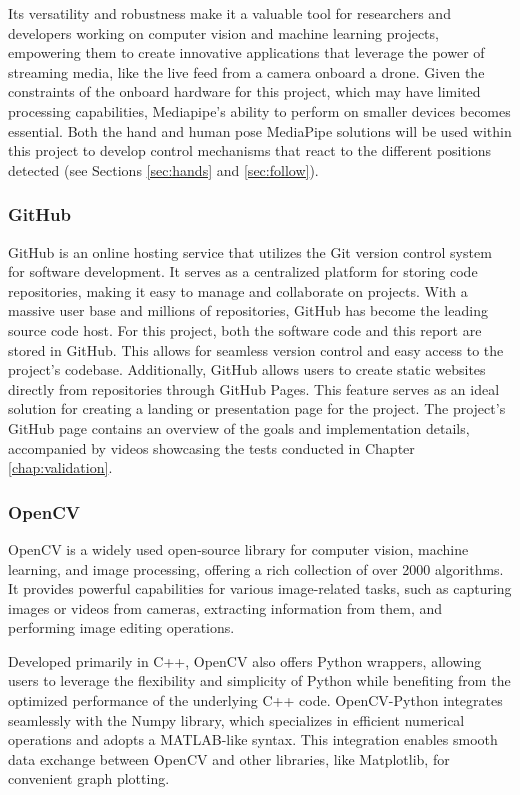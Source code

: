 Its versatility and robustness make it a valuable tool for researchers and developers working on computer vision and machine learning projects, empowering them to create innovative applications that leverage the power of streaming media, like the live feed from a camera onboard a drone.
Given the constraints of the onboard hardware for this project, which may have limited processing capabilities, Mediapipe's ability to perform on smaller devices becomes essential. Both the hand and human pose MediaPipe solutions will be used within this project to develop control mechanisms that react to the different positions detected (see Sections \ref{sec:hands} and \ref{sec:follow}).


\subsubsection{GitHub}
\label{subsec:github}

GitHub is an online hosting service that utilizes the Git version control system for software development. It serves as a centralized platform for storing code repositories, making it easy to manage and collaborate on projects. With a massive user base and millions of repositories, GitHub has become the leading source code host. For this project, both the software code \cite{dronecontrol-front} and this report \cite{memoria-front} are stored in GitHub. This allows for seamless version control and easy access to the project's codebase. 
Additionally, GitHub allows users to create static websites directly from repositories through GitHub Pages. This feature serves as an ideal solution for creating a landing or presentation page for the project. The project's GitHub page \cite{page-front} contains an overview of the goals and implementation details, accompanied by videos showcasing the tests conducted in Chapter \ref{chap:validation}.


\subsubsection{OpenCV}
\label{subsec:opencv}

OpenCV is a widely used open-source library for computer vision, machine learning, and image processing, offering a rich collection of over 2000 algorithms. It provides powerful capabilities for various image-related tasks, such as capturing images or videos from cameras, extracting information from them, and performing image editing operations.

Developed primarily in C++, OpenCV also offers Python wrappers, allowing users to leverage the flexibility and simplicity of Python while benefiting from the optimized performance of the underlying C++ code. OpenCV-Python integrates seamlessly with the Numpy library, which specializes in efficient numerical operations and adopts a MATLAB-like syntax. This integration enables smooth data exchange between OpenCV and other libraries, like Matplotlib, for convenient graph plotting.

